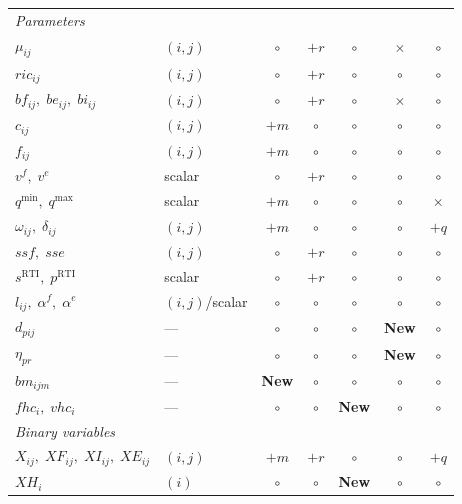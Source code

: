 \begin{longtable}{llccccc}
\multicolumn{7}{l}{\textit{Parameters}} \\
$\mu_{ij}$
  & $(i,j)$
  & $\circ$ & $+r$ & $\circ$ & $\times$ & $\circ$ \\
$ric_{ij}$
  & $(i,j)$
  & $\circ$ & $+r$ & $\circ$ & $\circ$ & $\circ$ \\
$bf_{ij},\;be_{ij},\;bi_{ij}$
  & $(i,j)$
  & $\circ$ & $+r$ & $\circ$ & $\times$ & $\circ$ \\
$c_{ij}$
  & $(i,j)$
  & $+m$ & $\circ$ & $\circ$ & $\circ$ & $\circ$ \\
$f_{ij}$
  & $(i,j)$
  & $+m$ & $\circ$ & $\circ$ & $\circ$ & $\circ$ \\
$v^{f},\;v^{e}$
  & scalar
  & $\circ$ & $+r$ & $\circ$ & $\circ$ & $\circ$ \\
$q^{\min},\;q^{\max}$
  & scalar
  & $+m$ & $\circ$ & $\circ$ & $\circ$ & $\times$ \\
$\omega_{ij},\;\delta_{ij}$
  & $(i,j)$
  & $+m$ & $\circ$ & $\circ$ & $\circ$ & $+q$ \\
$ssf,\;sse$
  & $(i,j)$
  & $\circ$ & $+r$ & $\circ$ & $\circ$ & $\circ$ \\
$s^{\text{RTI}},\;p^{\text{RTI}}$
  & scalar
  & $\circ$ & $+r$ & $\circ$ & $\circ$ & $\circ$ \\
$l_{ij},\;\alpha^f,\;\alpha^e$
  & $(i,j)$/scalar
  & $\circ$ & $\circ$ & $\circ$ & $\circ$ & $\circ$ \\
$d_{pij}$
  & ---
  & $\circ$ & $\circ$ & $\circ$ & \textbf{New} & $\circ$ \\
$\eta_{pr}$
  & ---
  & $\circ$ & $\circ$ & $\circ$ & \textbf{New} & $\circ$ \\
{$bm_{ijm}$}
  & {---}
  & {\textbf{New}} & {$\circ$}
  & {$\circ$}  & {$\circ$}
  & {$\circ$} \\
{$fhc_{i},\;vhc_{i}$}
  & {---}
  & {$\circ$}     & {$\circ$}
  & {\textbf{New}} & {$\circ$}
  & {$\circ$} \\[4pt]

\multicolumn{7}{l}{\textit{Binary variables}} \\
$X_{ij},\;XF_{ij},\;XI_{ij},\;XE_{ij}$
  & $(i,j)$
  & $+m$ & $+r$ & $\circ$ & $\circ$ & $+q$ \\[4pt]
$XH_{i}$
  & $(i)$
  & $\circ$ & $\circ$ & \textbf{New} & $\circ$ & $\circ$ \\[4pt]


\end{longtable}
